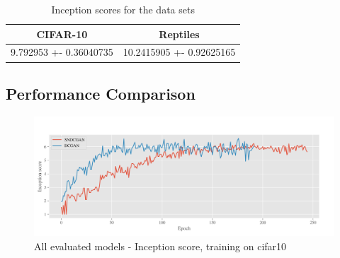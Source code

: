 \begin{table}[H]
\centering
\caption{Inception scores for the data sets}
\label{table:GS}
\begin{tabular}{c@{\hskip .5in} c}
\toprule
CIFAR-10                   & Reptiles   \\ 
\midrule
      9.792953 +- 0.36040735 & 10.2415905 +- 0.92625165 \\   

\bottomrule
\end{tabular}
\end{table}










\subsection{Performance Comparison}

\begin{figure}[h]
\centering
\includegraphics[width=\textwidth]{../code/results/figures/all_cifar10_is.png}
\caption{All evaluated models - Inception score, training on cifar10}
\label{fig:exp-dcgan-is}
\end{figure}

